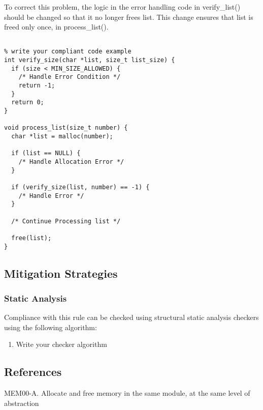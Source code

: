 To correct this problem, the logic in the error handling code in verify\_list()
should be changed so that it no longer frees list. This change ensures that list
is freed only once, in process\_list().

\begin{verbatim}

% write your compliant code example
int verify_size(char *list, size_t list_size) {
  if (size < MIN_SIZE_ALLOWED) {
    /* Handle Error Condition */
    return -1;
  }
  return 0;
}

void process_list(size_t number) {
  char *list = malloc(number);

  if (list == NULL) {
    /* Handle Allocation Error */
  }

  if (verify_size(list, number) == -1) {
    /* Handle Error */
  }

  /* Continue Processing list */

  free(list);
}

\end{verbatim}

\subsection{Mitigation Strategies}
\subsubsection{Static Analysis} 

Compliance with this rule can be checked using structural static analysis checkers using the following algorithm:

\begin{enumerate}
\item Write your checker algorithm
\end{enumerate}

\subsection{References}


 MEM00-A. Allocate and free memory in the same module, at the same level of abstraction
